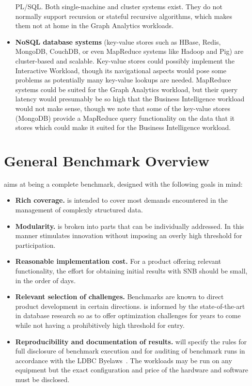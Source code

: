 \begin{itemize}
     PL/SQL. Both single-machine and cluster systems exist. They do not
     normally support recursion or stateful recursive algorithms, which makes     them not at home in the Graph Analytics workloads.
 \item \textbf{NoSQL database systems} (\eg key-value stores such as HBase,
     Redis, MongoDB, CouchDB, or even MapReduce systems like Hadoop and Pig)
     are cluster-based and scalable. Key-value stores could possibly implement
     the Interactive Workload, though its navigational aspects would pose some
     problems as potentially many key-value lookups are needed. MapReduce
     systems could be suited for the Graph Analytics workload, but their query
     latency would presumably be so high that the Business Intelligence
     workload would not make sense, though we note that some of the key-value
     stores (\eg MongoDB) provide a MapReduce query functionality on the data
     that it stores which could make it suited for the Business Intelligence workload.
\end{itemize}


\section{General Benchmark Overview}

\ldbcsnb aims at being a complete benchmark, designed with the following goals in mind:

\begin{itemize}
 \item \textbf{Rich coverage.} \ldbcsnb is intended to cover most demands
     encountered in the management of complexly structured data.
 \item \textbf{Modularity.} \ldbcsnb is broken into parts that can be
     individually addressed. In this manner \ldbcsnb
     stimulates innovation without imposing an overly high threshold for
     participation.
 \item \textbf{Reasonable implementation cost.} For a product offering relevant
     functionality, the effort for obtaining initial results with SNB should be
     small, in the order of days.
 \item \textbf{Relevant selection of challenges.} Benchmarks are known to
     direct product development in certain directions. \ldbcsnb is informed by
     the state-of-the-art in database research so as to offer optimization
     challenges for years to come while not having a prohibitively high
     threshold for entry.
 \item \textbf{Reproducibility and documentation of results.} \ldbcsnb
     will specify the rules for full disclosure of benchmark execution and for
     auditing of benchmark runs in accordance with the LDBC Byelaws~\cite{ldbc_byelaws}.
     The workloads may be run on any equipment
     but the exact configuration and price of the hardware and software must be
     disclosed.
\end{itemize}

